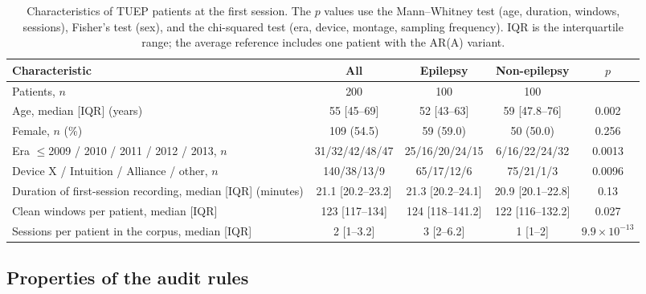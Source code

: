 \begin{table}[t]
\caption{Characteristics of TUEP patients at the first session. The $p$ values use the Mann--Whitney test (age, duration, windows, sessions), Fisher's test (sex), and the chi-squared test (era, device, montage, sampling frequency). IQR is the interquartile range; the average reference includes one patient with the AR(A) variant.}\label{tab:kohort}
\centering\scriptsize
\setlength{\tabcolsep}{2.5pt}
\begin{tabular}{p{}cccc}
\toprule
Characteristic & All & Epilepsy & Non-epilepsy & $p$ \\
\midrule
Patients, $n$ & 200 & 100 & 100 & \\
Age, median [IQR] (years) & 55 [45--69] & 52 [43--63] & 59 [47.8--76] & 0.002 \\
Female, $n$ (\%) & 109 (54.5) & 59 (59.0) & 50 (50.0) & 0.256 \\
Era $\leq$2009 / 2010 / 2011 / 2012 / 2013, $n$ & 31/32/42/48/47 & 25/16/20/24/15 & 6/16/22/24/32 & 0.0013 \\
Device X / Intuition / Alliance / other, $n$ & 140/38/13/9 & 65/17/12/6 & 75/21/1/3 & 0.0096 \\
Duration of first-session recording, median [IQR] (minutes) & 21.1 [20.2--23.2] & 21.3 [20.2--24.1] & 20.9 [20.1--22.8] & 0.13 \\
Clean windows per patient, median [IQR] & 123 [117--134] & 124 [118--141.2] & 122 [116--132.2] & 0.027 \\
Sessions per patient in the corpus, median [IQR] & 2 [1--3.2] & 3 [2--6.2] & 1 [1--2] & $9.9\times10^{-13}$ \\
\bottomrule
\end{tabular}
\end{table}

\subsection{Properties of the audit rules}\label{sec:oc}

